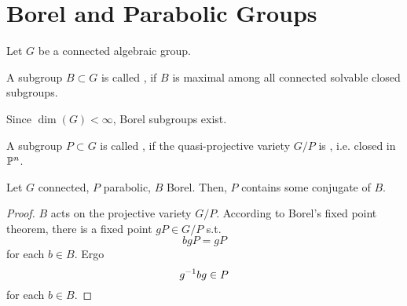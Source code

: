 \section{Borel and Parabolic Groups}
Let $G$ be a connected algebraic group.
\begin{definition}
	A subgroup $B \subset G$ is called , if $B$ is maximal among all connected solvable closed subgroups.
	
	Since $\dim(G) < \infty$, Borel subgroups exist.
\end{definition}
\begin{definition}
	A subgroup $P \subset G$ is called , if the quasi-projective variety $G / P$ is , i.e. closed in $\P^n$.
\end{definition}
\begin{lemma}
	Let $G$ connected, $P$ parabolic, $B$ Borel. Then, $P$ contains some conjugate of $B$.
\end{lemma}
\begin{proof}
	$B$ acts on the projective variety $G/P$. According to Borel's fixed point theorem, there is a fixed point $gP \in G/P$ s.t.
	\[ bgP = gP \]
	for each $b \in B$. Ergo
	\[ g\i b g \in P \]
	for each $b \in B$.
\end{proof}

